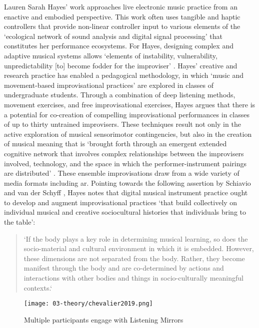 Lauren Sarah Hayes' work approaches live electronic music practice from an enactive and embodied perspective. This work often uses tangible and haptic controllers that provide non-linear controller input to various elements of the `ecological network of sound analysis and digital signal processing' that constitutes her performance ecosystems. For Hayes, designing complex and adaptive musical systems allows `elements of instability, vulnerability, unpredictability [to] become fodder for the improviser' \citep[p. 2]{hayes2018}. Hayes' creative and research practice has enabled a pedagogical methodology, in which `music and movement-based improvisational practices' are explored in classes of undergraduate students. Through a combination of deep listening methods, movement exercises, and free improvisational exercises, Hayes argues that there is a potential for co-creation of compelling improvisational performances in classes of up to thirty untrained improvisers. These techniques result not only in the active exploration of musical sensorimotor contingencies, but also in the creation of musical meaning that is `brought forth through an emergent extended cognitive network that involves complex relationships between the improvisers involved, technology, and the space in which the performer-instrument pairings are distributed' \citep[p. 8]{hayes2019}. These ensemble improvisations draw from a wide variety of media formats including \gls{ar}. Pointing towards the following assertion by Schiavio and van der Schyff \citeyearpar{schiavio2018}, Hayes notes that digital musical instrument practice ought to develop and augment improvisational practices `that build collectively on individual musical and creative sociocultural histories that individuals bring to the table':
\begin{quote}
    `If the body plays a key role in determining musical learning, so does the socio-material and cultural environment in which it is embedded. However, these dimensions are not separated from the body. Rather, they become manifest through the body and are co-determined by actions and interactions with other bodies and things in socio-culturally meaningful contexts.` \citep[p. 9]{hayes2018}
\end{quote}

\begin{wrapfigure}{l}{0.45\textwidth}
    \vspace{-\intextsep}
\begin{minipage}{0.95\linewidth}
    \texttt{[image: 03-theory/chevalier2019.png]}
    \captionsetup{justification=justified}
    \caption{Multiple participants engage with Listening Mirrors \citep[from][]{chevalier2019}}\label{fig: chevalier2019}
\end{minipage}
\hfill
\end{wrapfigure}

